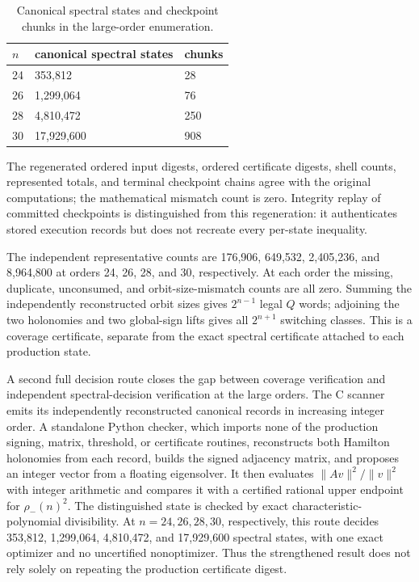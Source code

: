 \begin{table}[tbp]
\centering
\caption{Canonical spectral states and checkpoint chunks in the large-order enumeration.}
\label{tab:checkpoint-counts}
\begingroup
\renewcommand{\arraystretch}{1.12}
\begin{tabular}{lll}
\toprule
\(n\) & canonical spectral states & chunks \\
\midrule
24 & 353,812 & 28 \\
26 & 1,299,064 & 76 \\
28 & 4,810,472 & 250 \\
30 & 17,929,600 & 908 \\
\bottomrule
\end{tabular}
\endgroup
\end{table}

The regenerated ordered input digests, ordered certificate digests, shell
counts, represented totals, and terminal checkpoint chains agree with the
original computations; the mathematical mismatch count is zero. Integrity
replay of committed checkpoints is distinguished from this regeneration: it
authenticates stored execution records but does not recreate every per-state
inequality.

The independent representative counts are 176,906, 649,532, 2,405,236, and
8,964,800 at orders 24, 26, 28, and 30, respectively. At each order the missing,
duplicate, unconsumed, and orbit-size-mismatch counts are all zero. Summing the
independently reconstructed orbit sizes gives \(2^{n-1}\) legal \(Q\) words;
adjoining the two holonomies and two global-sign lifts gives all \(2^{n+1}\)
switching classes. This is a coverage certificate, separate from the exact
spectral certificate attached to each production state.

A second full decision route closes the gap between coverage verification and
independent spectral-decision verification at the large orders. The C
scanner emits its independently reconstructed canonical records in increasing
integer order. A standalone Python checker, which imports none of the
production signing, matrix, threshold, or certificate routines, reconstructs
both Hamilton holonomies from each record, builds the signed adjacency matrix,
and proposes an integer vector from a floating eigensolver. It then evaluates
\(\lVert Av\rVert^2/\lVert v\rVert^2\) with integer arithmetic and compares it
with a certified rational upper endpoint for \(\rho_-(n)^2\). The distinguished
state is checked by exact characteristic-polynomial divisibility. At
\(n=24,26,28,30\), respectively, this route decides 353,812, 1,299,064,
4,810,472, and 17,929,600 spectral states, with one exact optimizer and no
uncertified nonoptimizer. Thus the strengthened result does not rely solely on
repeating the production certificate digest.

